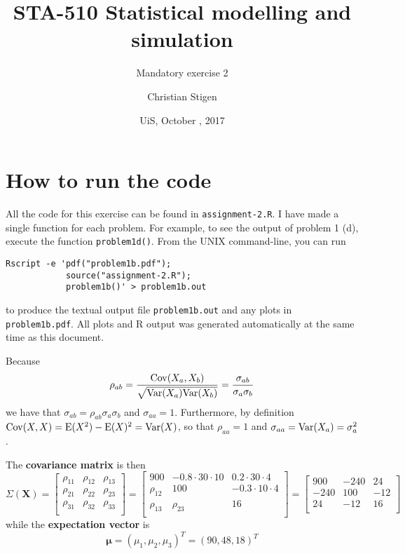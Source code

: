 \documentclass[a4paper,english,12pt]{article}
\title{STA-510 Statistical modelling and simulation}
\subtitle{Mandatory exercise 2}
\author{Christian Stigen}
\date{UiS, October \nth{19}, 2017}
\begin{document}
\maketitle
\section*{\normalsize{How to run the code}}
All the code for this exercise can be found in \texttt{assignment-2.R}. I have
made a single function for each problem. For example, to see the output of
problem 1 (d), execute the function \texttt{problem1d()}.  From the UNIX
command-line, you can run
\begin{verbatim}
Rscript -e 'pdf("problem1b.pdf");
            source("assignment-2.R");
            problem1b()' > problem1b.out
\end{verbatim}
to produce the textual output file \texttt{problem1b.out} and any plots in
\texttt{problem1b.pdf}. All plots and R output was generated automatically at
the same time as this document.

\label{problem.1a}
Because
\begin{align*}
  \rho_{ab} &= \frac{\mathrm{Cov}(X_a, X_b)}{\sqrt{\mathrm{Var}(X_a)\mathrm{Var}(X_b)}} =
    \frac{\sigma_{ab}}{\sigma_a\sigma_b} \\
\end{align*}
we have that $\sigma_{ab} = \rho_{ab}\sigma_a\sigma_b$ and $\sigma_{aa} = 1$.
Furthermore, by definition $\mathrm{Cov}(X,X) = \mathrm{E}(X^2) - \mathrm{E}(X)^2 = \mathrm{Var}(X)$,
so that $\rho_{aa} = 1$ and $\sigma_{aa} = \mathrm{Var}(X_a) = \sigma_a^2$.

The \textbf{covariance matrix} is then
\[
  \Sigma\left(\textbf{X}\right) =
    \begin{bmatrix}
      \rho_{11} & \rho_{12} & \rho_{13} \\
      \rho_{21} & \rho_{22} & \rho_{23} \\
      \rho_{31} & \rho_{32} & \rho_{33} \\
    \end{bmatrix}
  =
    \begin{bmatrix}
      900 & -0.8 \cdot 30 \cdot 10 & 0.2 \cdot 30 \cdot 4 \\
      \rho_{12} & 100 & -0.3 \cdot 10 \cdot 4 \\
      \rho_{13} & \rho_{23} & 16 \\
    \end{bmatrix}
  =
    \begin{bmatrix}
       900 & -240 &  24 \\
      -240 &  100 & -12 \\
        24 &  -12 &  16 \\
    \end{bmatrix}
\]
while the \textbf{expectation vector} is
\[
  \bm{\mu} = \left( \mu_1 , \mu_2, \mu_3 \right)^T 
    = \left( 90, 48, 18 \right)^T
\]
\end{document}
